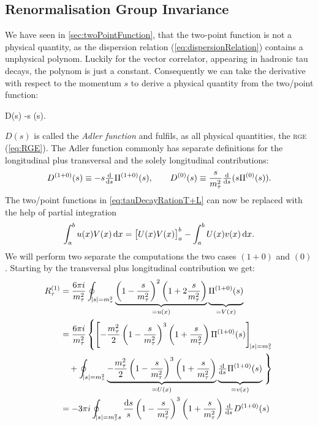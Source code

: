 \documentclass[../../index.tex]{subfiles}
\begin{document}
\subsection{Renormalisation Group Invariance}
We have seen in \cref{sec:twoPointFunction}, that the two-point function is not
a physical quantity, as the dispersion relation (\cref{eq:dispersionRelation})
contains a unphysical polynom. Luckily for the vector correlator, appearing in
hadronic tau decays, the polynom is just a constant. Consequently we can take
the derivative with respect to the momentum \(s\) to derive a physical quantity
from the two\-/point function:
\begin{tcolorbox}
  D(s) \equiv -s  \Pi(s).
\end{tcolorbox}
\(D(s)\) is called the \textit{Adler function} and fulfils, as all physical
quantities, the \textsc{rge} (\cref{eq:RGE}). The Adler function commonly has
separate definitions for the longitudinal plus transversal and the solely
longitudinal contributions:
\begin{equation}
  \label{eq:adlerFunction}
  D^{(1+0)}(s) \equiv -s \od{}{s} \Pi^{(1+0)}(s), \qquad D^{(0)}(s) \equiv \frac{s}{m_\tau^2} \od{}{s} (s \Pi^{(0)}(s)).
\end{equation}
The two\-/point functions in \cref{eq:tauDecayRationT+L} can now be replaced
with the help of partial integration
\begin{equation}
  \int_a^b u(x) V(x) \dif x = \left[ U(x) V(x) \right]_a^b - \int_a^b U(x) v(x) \dif x.
\end{equation}
We will perform two separate the computations the two cases \((1+0)\) and
\((0)\). Starting by the transversal plus longitudinal contribution we get:
\begin{equation}
  \begin{split}
    R_\tau^{(1)} &= \frac{6 \pi i}{m_\tau^2}
    \oint_{\abs{s}=m_\tau^2}\underbrace{ \left( 1 - \frac{s}{m_\tau^2} \right)^2
      \left( 1 + 2 \frac{s}{m_\tau^2} \right)
    }_{= u(x)} \underbrace{ \vphantom{\left( \frac{s}{m_\tau^2} \right)} \Pi^{(1+0)}(s)}_{=V(x)} \\
    &= \frac{6 \pi i}{m_\tau^2} \left\{ \left[ -\frac{m_\tau^2}{2} \left( 1 -
          \frac{s}{m_\tau^2} \right)^3 \left( 1 + \frac{s}{m_\tau^2} \right)
        \Pi^{(1+0)}(s) \right]_{\abs{s}=m_\tau^2} \right. \\
    &\quad+ \oint_{\abs{s}=m_\tau^2} \underbrace{-\frac{m_\tau^2}{2} \left( 1 -
        \frac{s}{m_\tau^2} \right)^3 \left( 1 + \frac{s}{m_\tau^2} \right)
    }_{=U(x)} \underbrace{\vphantom{\left( \frac{1}{m_\tau^2} \right)}\od{}{s}
      \Pi^{(1+0)}(s)}_{=v(x)}
    \left. \vphantom{\left[ \left( \frac{1}{m_\tau^2} \right) \right]} \right\} \\
    &= -3 \pi i \oint_{\abs{s}=m_\tau^2s} \frac{\dif s}{s} \left( 1 -
      \frac{s}{m_\tau^2} \right)^3 \left( 1 + \frac{s}{m_\tau^2} \right)
    \od{}{s} D^{(1+0)}(s)
  \end{split}
\end{equation}
\end{document}
